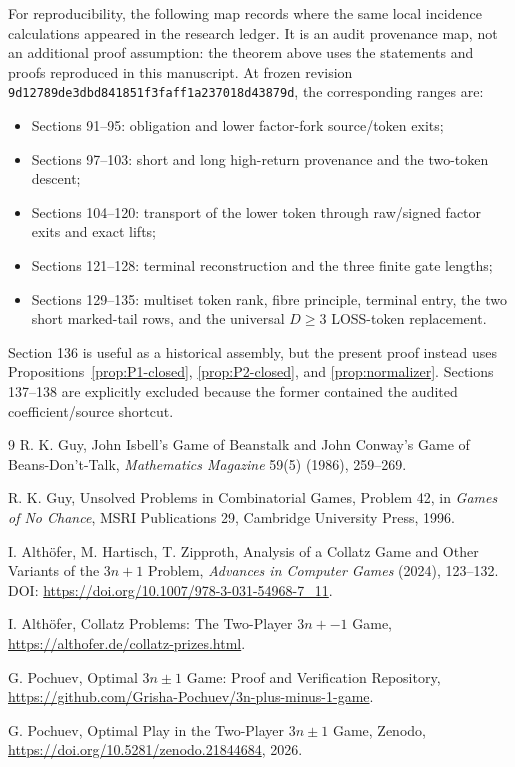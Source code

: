 For reproducibility, the following map records where the same local incidence
calculations appeared in the research ledger.  It is an audit provenance map,
not an additional proof assumption: the theorem above uses the statements and
proofs reproduced in this manuscript.  At frozen revision
\nolinkurl{9d12789de3dbd841851f3faff1a237018d43879d}, the corresponding ranges
are:
\begin{itemize}[leftmargin=*]
\item Sections 91--95: obligation and lower factor-fork source/token exits;
\item Sections 97--103: short and long high-return provenance and the
      two-token descent;
\item Sections 104--120: transport of the lower token through raw/signed
      factor exits and exact lifts;
\item Sections 121--128: terminal reconstruction and the three finite gate
      lengths;
\item Sections 129--135: multiset token rank, fibre principle, terminal entry,
      the two short marked-tail rows, and the universal $D\ge3$ LOSS-token
      replacement.
\end{itemize}
Section 136 is useful as a historical assembly, but the present proof instead
uses Propositions~\ref{prop:P1-closed}, \ref{prop:P2-closed}, and
\ref{prop:normalizer}.  Sections 137--138 are explicitly excluded because the
former contained the audited coefficient/source shortcut.

\begin{thebibliography}{9}
R. K. Guy, John Isbell's Game of Beanstalk and John Conway's Game of
Beans-Don't-Talk, \emph{Mathematics Magazine} 59(5) (1986), 259--269.

R. K. Guy, Unsolved Problems in Combinatorial Games, Problem 42, in
\emph{Games of No Chance}, MSRI Publications 29, Cambridge University Press,
1996.

I. Alth\"ofer, M. Hartisch, T. Zipproth, Analysis of a Collatz Game and Other
Variants of the $3n+1$ Problem, \emph{Advances in Computer Games} (2024),
123--132. DOI: \url{https://doi.org/10.1007/978-3-031-54968-7_11}.

I. Alth\"ofer, Collatz Problems: The Two-Player $3n+-1$ Game,
\url{https://althofer.de/collatz-prizes.html}.

G. Pochuev, Optimal $3n\pm1$ Game: Proof and Verification Repository,
\url{https://github.com/Grisha-Pochuev/3n-plus-minus-1-game}.

G. Pochuev, Optimal Play in the Two-Player $3n\pm1$ Game, Zenodo,
\url{https://doi.org/10.5281/zenodo.21844684}, 2026.
\end{thebibliography}


